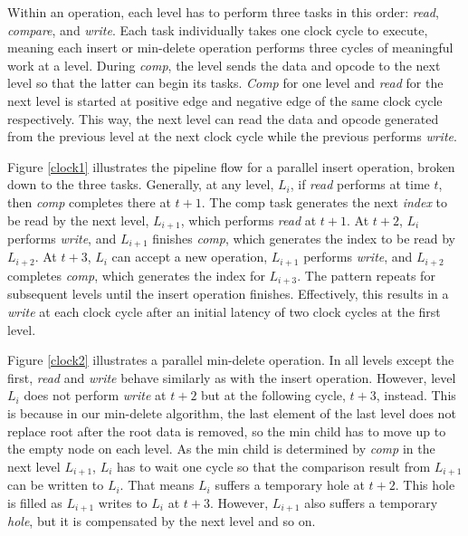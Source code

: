 Within an operation, each level has to perform three tasks in this order: {\it read}, {\it compare}, and {\it write}.
Each task individually takes one clock cycle to execute, meaning each insert or min-delete operation performs three cycles of meaningful work at a level.
During {\it comp}, the level sends the data and opcode to the next level so that the latter can begin its tasks.
{\it Comp} for one level and {\it read} for the next level is started at positive edge and negative edge of the same clock cycle respectively. This way, the next level can read the data and opcode generated from the previous level at the next clock cycle while the previous performs {\it write}.


Figure \ref{clock1} illustrates the pipeline flow for a parallel insert operation, broken down to the three tasks.
Generally, at any level, $L_i$, if {\it read} performs at time $t$, then {\it comp} completes there at $t+1$.
The comp task generates the next {\it index} to be read by the next level, $L_{i+1}$, which performs {\it read} at $t+1$.
At $t+2$, $L_i$ performs {\it write}, and $L_{i+1}$ finishes {\it comp}, which generates the index to be read by $L_{i+2}$.
At $t+3$, $L_i$ can accept a new operation, $L_{i+1}$ performs {\it write}, and $L_{i+2}$ completes {\it comp}, which generates the index for $L_{i+3}$. 
The pattern repeats for subsequent levels until the insert operation finishes.
Effectively, this results in a {\it write} at each clock cycle after an initial latency of two clock cycles at the first level.


Figure \ref{clock2} illustrates a parallel min-delete operation. 
In all levels except the first, {\it read} and {\it write} behave similarly as with the insert operation.
However, level $L_i$ does not perform {\it write} at $t+2$ but at the following cycle, $t+3$, instead.
This is because in our min-delete algorithm, the last element of the last level does not replace root after the root data is removed, so the min child has to move up to the empty node on each level.
As the min child is determined by {\it comp} in the next level $L_{i+1}$, $L_i$ has to wait one cycle so that the comparison result from $L_{i+1}$ can be written to $L_i$.
That means $L_i$ suffers a temporary hole at $t+2$.
This hole is filled as $L_{i+1}$ writes to $L_i$ at $t+3$.
However, $L_{i+1}$ also suffers a temporary {\it hole}, but it is compensated by the next level and so on.



